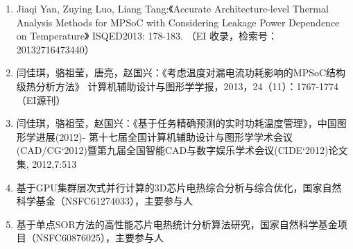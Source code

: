 \begin{paper}

\begin{enumerate}
	

	\item Jiaqi Yan, Zuying Luo, Liang Tang:《Accurate Architecture-level Thermal Analysis Methods for MPSoC with Considering Leakage Power Dependence on Temperature》 ISQED2013: 178-183. （EI 收录，检索号：20132716473440）
	\item 闫佳琪，骆祖莹，唐亮，赵国兴：《考虑温度对漏电流功耗影响的MPSoC结构级热分析方法》 计算机辅助设计与图形学学报，2013，24（11）：1767-1774 （EI源刊）
	\item 闫佳琪，骆祖莹，赵国兴：《基于任务精确预测的实时功耗温度管理》，中国图形学进展(2012)- 第十七届全国计算机辅助设计与图形学学术会议(CAD/CG`2012)暨第九届全国智能CAD与数字娱乐学术会议(CIDE`2012)论文集, 2012,7:513
    \item 基于GPU集群层次式并行计算的3D芯片电热综合分析与综合优化，国家自然科学基金（NSFC61274033），主要参与人
    \item 基于单点SOR方法的高性能芯片电热统计分析算法研究，国家自然科学基金项目（NSFC60876025），主要参与人

\end{enumerate}

\end{paper}
